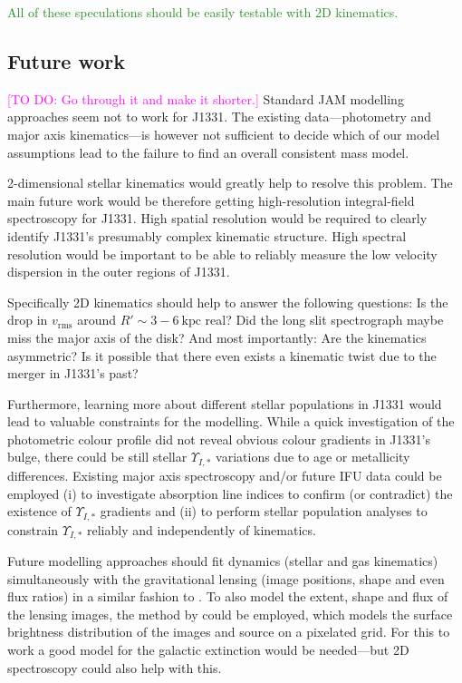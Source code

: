 \documentclass[useAMS,usenatbib]{mnras}
\newcommand{\Wilma}[1]{\textcolor{Magenta}{#1}}
\newcommand{\NEW}[1]{\textcolor{ForestGreen}{#1}}
\begin{document}
\NEW{All of these speculations should be easily testable with 2D kinematics.}

\subsection{Future work}
\Wilma{[TO DO: Go through it and make it shorter.]}
Standard JAM modelling approaches seem not to work for J1331. The existing data---photometry and major axis kinematics---is however not sufficient to decide which of our model assumptions lead to the failure to find an overall consistent mass model.

2-dimensional stellar kinematics would greatly help to resolve this problem. The main future work would be therefore getting high-resolution integral-field spectroscopy for J1331. High spatial resolution would be required to clearly identify J1331's presumably complex kinematic structure. High spectral resolution would be important to be able to reliably measure the low velocity dispersion in the outer regions of J1331.

Specifically 2D kinematics should help to answer the following questions: Is the drop in $v_\text{rms}$ around $R' \sim 3-6~\text{kpc}$ real? Did the long slit spectrograph maybe miss the major axis of the disk? And most importantly: Are the kinematics asymmetric? Is it possible that there even exists a kinematic twist due to the merger in J1331's past?

Furthermore, learning more about different stellar populations in J1331 would lead to valuable constraints for the modelling. While a quick investigation of the photometric colour profile did not reveal obvious colour gradients in J1331's bulge, there could be still stellar $\Upsilon_{I,*}$ variations due to age or metallicity differences. Existing major axis spectroscopy and/or future IFU data could be employed (i) to investigate absorption line indices to confirm (or contradict) the existence of $\Upsilon_{I,*}$ gradients and (ii) to perform stellar population analyses to constrain $\Upsilon_{I,*}$ reliably and independently of kinematics.

Future modelling approaches should fit dynamics (stellar and gas kinematics) simultaneously with the gravitational lensing (image positions, shape and even flux ratios) in a similar fashion to \citet{SWELLSIV}. To also model the extent, shape and flux of the lensing images, the method by \citet{2004ApJ...611..739T,2003ApJ...590..673W} could be employed, which models the surface brightness distribution of the images and source on a pixelated grid. For this to work a good model for the galactic extinction would be needed---but 2D spectroscopy could also help with this.
\end{document}
